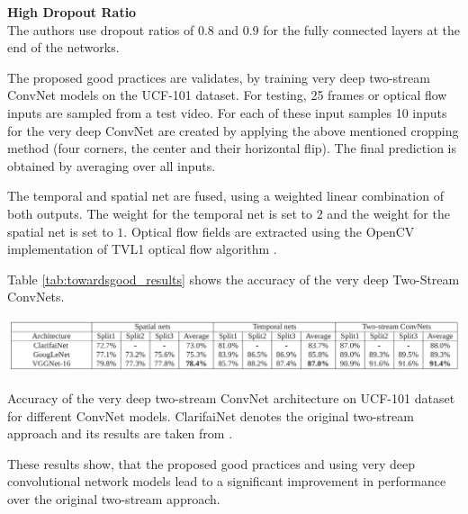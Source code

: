 \textbf{High Dropout Ratio}\\
The authors use dropout ratios of 0.8 and 0.9 for the fully connected layers at the end of the networks.

The proposed good practices are validates, by training very deep two-stream ConvNet models on the UCF-101 dataset.
For testing, 25 frames or optical flow inputs are sampled from a test video.
For each of these input samples 10 inputs for the very deep ConvNet are created by applying the above mentioned cropping method (four corners, the center and their horizontal flip).
The final prediction is obtained by averaging over all inputs.

The temporal and spatial net are fused, using a weighted linear combination of both outputs.
The weight for the temporal net is set to $2$ and the weight for the spatial net is set to $1$.
Optical flow fields are extracted using the OpenCV implementation of TVL1 optical flow algorithm \cite{zach_duality_2007}.

Table \ref{tab:towardsgood_results} shows the accuracy of the very deep Two-Stream ConvNets.

\begin{table}[H]
    \centering
    \includegraphics[width=\textwidth]{img_deep/towardsgood_results}
    \caption{Accuracy of the very deep two-stream ConvNet architecture on UCF-101 dataset for different ConvNet models. ClarifaiNet denotes the original two-stream approach and its results are taken from \cite{simonyan_two-stream_2014}. \cite{wang_towards_2015}}
    \label{tab:towardsgood_results}
\end{table}

These results show, that the proposed good practices and using very deep convolutional network models lead to a significant improvement in performance over the original two-stream approach.


